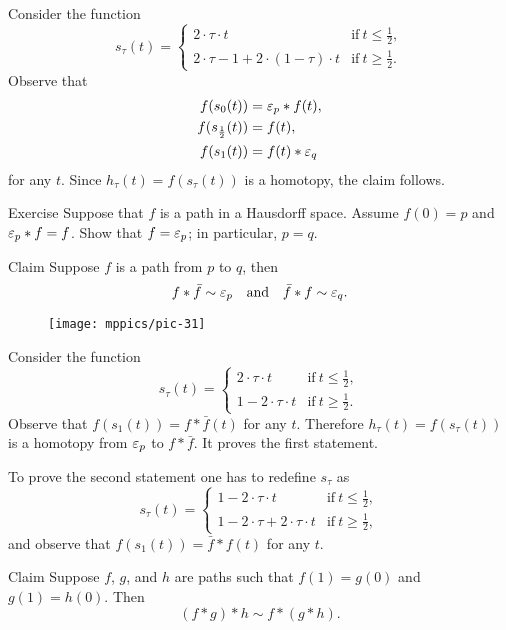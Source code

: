 Consider the function
\[s_\tau(t)=
\begin{cases}
2\cdot \tau \cdot t&\text{if}\ t\le \tfrac12,
\\
2\cdot\tau-1+2\cdot (1-\tau) \cdot t&\text{if}\ t\ge \tfrac12.
\end{cases}
\]
Observe that 
\begin{align*}
f(s_0(t))&=\varepsilon_p*f(t),
\\
f(s_{\frac12}(t))&=f(t),
\\
f(s_1(t))&=f(t)*\varepsilon_q
\end{align*}
for any $t$.
Since $h_\tau(t)=f(s_\tau(t))$ is a homotopy, the claim follows.
\qeds

\begin{thm}{Exercise}\label{ex:neutral}
Suppose that $f$ is a path in a Hausdorff space.
Assume $f(0)=p$ and $\varepsilon_p*f= f$.
Show that $f=\varepsilon_p$; in particular, $p=q$.
\end{thm}

\begin{thm}{Claim}\label{clm:f-bar-f}
Suppose $f$ is a path from $p$ to $q$, then
\[f*\bar f\sim \varepsilon_p
\quad\text{and}\quad
\bar f*f\sim \varepsilon_q.\]
\end{thm}

{

\begin{wrapfigure}[12]{r}{30mm}
\centering
\texttt{[image: mppics/pic-31]}
\end{wrapfigure}

Consider the function
\[s_\tau(t)=
\begin{cases}
2\cdot \tau \cdot t&\text{if}\ t\le \tfrac12,
\\
1-2\cdot \tau \cdot t&\text{if}\ t\ge \tfrac12.
\end{cases}
\]
Observe that $f(s_1(t))=f*\bar f(t)$ for any $t$.
Therefore $h_\tau(t)=f(s_\tau(t))$ is a homotopy from $\varepsilon_p$ to $f*\bar f$.
It proves the first statement.



To prove the second statement one has to redefine $s_\tau$ as
\[s_\tau(t)=
\begin{cases}
1-2\cdot \tau \cdot t&\text{if}\ t\le \tfrac12,
\\
1-2\cdot\tau + 2\cdot \tau \cdot t&\text{if}\ t\ge \tfrac12,
\end{cases}
\]
and observe that $f(s_1(t))=\bar f*f(t)$ for any $t$.
\qeds

}

\begin{thm}{Claim}\label{clm:assoc}
Suppose $f$, 
$g$,
and
$h$ are paths such that $f(1)=g(0)$ and $g(1)=h(0)$.
Then
\[(f*g)*h\sim f*(g*h).\]
\end{thm}

